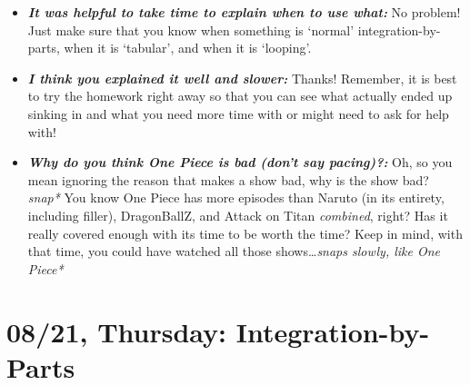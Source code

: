 \documentclass[11pt,letterpaper]{article}
\begin{document}
\begin{itemize}
\item {\bfseries\itshape It was helpful to take time to explain when to use what:} No problem! Just make sure that you know when something is `normal' integration-by-parts, when it is `tabular', and when it is `looping'. 

\item {\bfseries\itshape I think you explained it well and slower:} Thanks! Remember, it is best to try the homework right away so that you can see what actually ended up sinking in and what you need more time with or might need to ask for help with!

\item {\bfseries\itshape Why do you think One Piece is bad (don't say pacing)?:} Oh, so you mean ignoring the reason that makes a show bad, why is the show bad? {\itshape *snap*} You know One Piece has more episodes than Naruto (in its entirety, including filler), DragonBallZ, and Attack on Titan \textit{combined}, right? Has it really covered enough with its time to be worth the time? Keep in mind, with that time, you could have watched all those shows\dots {\itshape *snaps slowly, like One Piece*}
\end{itemize}

\newpage
\section*{08/21, Thursday: Integration-by-Parts\label{08-21}}
\end{document}
